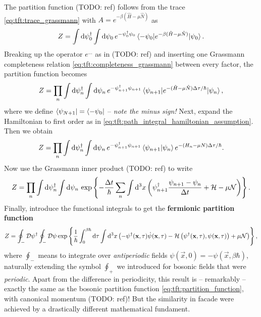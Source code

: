 The partition function (TODO: ref) follows from the trace \eqref{eq:tft:trace_grassmann} with $A = e^{-\beta (\hat{H} - \mu \hat{N})}$ as
\begin{equation}
	Z = \int \mathop{}\!\mathrm{d} \psi_0^\dagger \int \mathop{}\!\mathrm{d} \psi_0 \, e^{-\psi_{0}^\dagger \psi_{0}} \braket{-\psi_0 | e^{-\beta(\hat{H} - \mu \hat{N})} | \psi_0} .
\end{equation}
Breaking up the operator $e^{\ldots}$ as in (TODO: ref) and inserting one Grassmann completeness relation \eqref{eq:tft:completeness_grassmann} between every factor, the partition function becomes
\begin{equation}
	Z = \prod_n \int \mathop{}\!\mathrm{d} \psi_n^\dagger \int \mathop{}\!\mathrm{d} \psi_n \, e^{-\psi_{n+1}^\dagger \psi_{n+1}} \braket{\psi_{n+1} | e^{-(\hat{H} - \mu \hat{N}) \Delta \tau / \hbar} | \psi_n} ,
\end{equation}
where we define $\bra{\psi_{N+1}} = \bra{-\psi_0}$ -- \emph{note the minus sign!}
Next, expand the Hamiltonian to first order as in \eqref{eq:tft:path_integral_hamiltonian_assumption}.
Then we obtain
\begin{equation}
	Z = \prod_n \int \mathop{}\!\mathrm{d} \psi_n^\dagger \int \mathop{}\!\mathrm{d} \psi_n \, e^{-\psi_{n+1}^\dagger \psi_{n+1}} \braket{\psi_{n+1} | \psi_n} e^{-(H_n - \mu N) \Delta \tau / \hbar} .
\end{equation}
Now use the Grassmann inner product (TODO: ref) to write
\begin{equation}
	Z = \prod_n \int \mathop{}\!\mathrm{d} \psi_n^\dagger \int \mathop{}\!\mathrm{d} \psi_n \, \exp \left\{ -\frac{\Delta t}{\hbar} \sum_n \int \mathop{}\!\mathrm{d}^3 x \left( \psi^\dagger_{n+1} \frac{\psi_{n+1} - \psi_n}{\Delta t} + \mathcal{H} - \mu \mathcal{N} \right) \right\} .
\end{equation}
Finally, introduce the functional integrals to get the \textbf{fermionic partition function}
\begin{equation}
	Z = \oint_- \mathcal{D} \psi^\dagger \oint_- \mathcal{D} \psi \exp \left\{ \frac{1}{\hbar} \int_0^{\beta \hbar} \mathop{}\!\mathrm{d} \tau \int \mathop{}\!\mathrm{d}^3 x \left( -\psi^\dagger(\mathbf{x},\tau) \dot{\psi}(\mathbf{x},\tau) - \mathcal{H} \left( \psi^\dagger(\mathbf{x},\tau), \psi(\mathbf{x},\tau) \right) + \mu \mathcal{N} \right) \right\} ,
\end{equation}
where $\oint_-$ means to integrate over \emph{antiperiodic} fields $\psi(\vec{x}, 0) = -\psi(\vec{x}, \beta \hbar)$, naturally extending the symbol $\oint_+$ we introduced for bosonic fields that were \emph{periodic}.
Apart from the difference in periodicity, this result is -- remarkably -- exactly the same as the bosonic partition function \eqref{eq:tft:partition_function}, with canonical momentum (TODO: ref)!
But the similarity in facade were achieved by a drastically different mathematical fundament.

